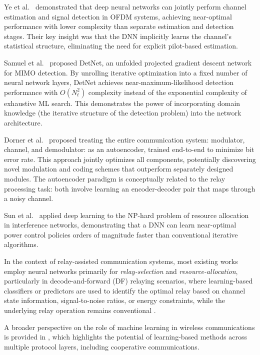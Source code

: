Ye et al.~\cite{YeLiJuang2018OFDMDL} demonstrated that deep neural networks can jointly perform channel estimation and signal detection in OFDM systems, achieving near-optimal performance with lower complexity than separate estimation and detection stages. Their key insight was that the DNN implicitly learns the channel's statistical structure, eliminating the need for explicit pilot-based estimation.

Samuel et al.~\cite{SamuelDiskinWunder2019MIMODetect} proposed DetNet, an unfolded projected gradient descent network for MIMO detection. By unrolling iterative optimization into a fixed number of neural network layers, DetNet achieves near-maximum-likelihood detection performance with \(O(N_t^2)\) complexity instead of the exponential complexity of exhaustive ML search. This demonstrates the power of incorporating domain knowledge (the iterative structure of the detection problem) into the network architecture.

Dorner et al.~\cite{Dorner2018OverTheAirDL} proposed treating the entire communication system: modulator, channel, and demodulator: as an autoencoder, trained end-to-end to minimize bit error rate. This approach jointly optimizes all components, potentially discovering novel modulation and coding schemes that outperform separately designed modules. The autoencoder paradigm is conceptually related to the relay processing task: both involve learning an encoder-decoder pair that maps through a noisy channel.

Sun et al.~\cite{Sun2018LearnToOptimize} applied deep learning to the NP-hard problem of resource allocation in interference networks, demonstrating that a DNN can learn near-optimal power control policies orders of magnitude faster than conventional iterative algorithms.

In the context of relay-assisted communication systems, most existing works employ neural networks primarily for \emph{relay-selection} and \emph{resource-allocation}, particularly in decode-and-forward (DF) relaying scenarios, where learning-based classifiers or predictors are used to identify the optimal relay based on channel state information, signal-to-noise ratios, or energy constraints, while the underlying relay operation remains conventional \cite{Akdemir2024DLRelaySelection}.

A broader perspective on the role of machine learning in wireless communications is provided in \cite{Gunduz2019MLAir}, which highlights the potential of learning-based methods across multiple protocol layers, including cooperative communications.

